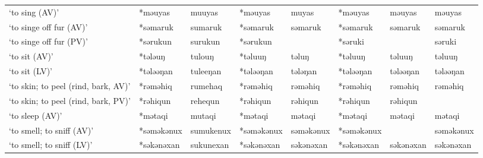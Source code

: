 \begin{landscape}
\begin{longtable}[c]{@{}p{3cm}<{\raggedright}p{2.75cm}<{\raggedright}p{2.75cm}<{\raggedright}p{2.75cm}<{\raggedright}p{2.75cm}<{\raggedright}p{2.75cm}<{\raggedright}p{2.75cm}<{\raggedright}p{2.75cm}<{\raggedright}@{}}
`to sing (AV)'                                       & *məuyas            & muuyas                         & *məuyas            & muyas                      & *məuyas          & məuyas                   & məuyas                            \\
`to singe off fur (AV)'                              & *səmaruk           & sumaruk                        & *səmaruk           & səmaruk                    & *səmaruk         & səmaruk                  & səmaruk                           \\
`to singe off fur (PV)'                              & *sərukun           & surukun                        & *sərukun           &                            & *səruki          &                          & səruki                            \\
`to sit (AV)'                                        & *tələuŋ            & tulouŋ                         & *təluuŋ            & təluŋ                      & *təluuŋ          & təluuŋ                   & təluuŋ                            \\
`to sit (LV)'                                        & *tələəŋan          & tuleeŋan                       & *tələəŋan          & tələŋan                    & *tələəŋan        & tələəŋan                 & tələəŋan                          \\
`to skin; to peel (rind, bark, AV)'                  & *rəməhiq           & rumehaq                        & *rəməhiq           & rəməhiq                    & *rəməhiq         & rəməhiq                  & rəməhiq                           \\
`to skin; to peel (rind, bark, PV)'                  & *rəhiqun           & rehequn                        & *rəhiqun           & rəhiqun                    & *rəhiqun         & rəhiqun                  &                                   \\
`to sleep (AV)'                                      & *mətaqi            & mutaqi                         & *mətaqi            & mətaqi                     & *mətaqi          & mətaqi                   & mətaqi                            \\
`to smell; to sniff (AV)'                            & *səməkənux         & sumukenux                      & *səməkənux         & səməkənux                  & *səməkənux       &                          & səməkənux                         \\
`to smell; to sniff (LV)'                            & *səkənəxan         & sukunexan                      & *səkənəxan         & səkənəxan                  & *səkənəxan       & səkənəxan                & səkənəxan                         \\

\end{longtable}
\end{landscape}
